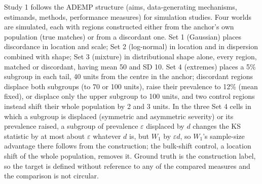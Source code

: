 \documentclass[AMA,Times1COL]{WileyNJDv5}
\begin{document}
Study 1 follows the ADEMP structure (aims, data-generating mechanisms, estimands, methods, performance measures) for simulation studies.\cite{morris2019} Four worlds are simulated, each with regions constructed either from the anchor's own population (true matches) or from a discordant one. Set 1 (Gaussian) places discordance in location and scale; Set 2 (log-normal) in location and in dispersion combined with shape; Set 3 (mixture) in distributional shape alone, every region, matched or discordant, having mean 50 and SD 10. Set 4 (extremes) places a 5\% subgroup in each tail, 40 units from the centre in the anchor; discordant regions displace both subgroups (to 70 or 100 units), raise their prevalence to 12\% (mean fixed), or displace only the upper subgroup to 100 units, and two control regions instead shift their whole population by 2 and 3 units. In the three Set 4 cells in which a subgroup is displaced (symmetric and asymmetric severity) or its prevalence raised, a subgroup of prevalence $\varepsilon$ displaced by $d$ changes the KS statistic by at most about $\varepsilon$ whatever $d$ is, but $W_1$ by $\varepsilon d$, so $W_1$'s sample-size advantage there follows from the construction; the bulk-shift control, a location shift of the whole population, removes it. Ground truth is the construction label, so the target is defined without reference to any of the compared measures and the comparison is not circular.
\end{document}
